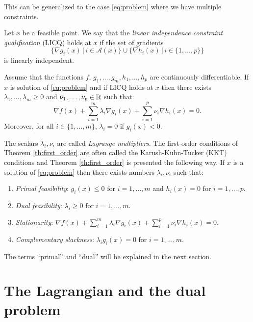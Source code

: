 \documentclass[11pt,nocut]{article}
\begin{document}
This can be generalized to the case \eqref{eq:problem} where we have multiple constraints.

\begin{definition}[LICQ]
	Let $x$ be a feasible point. We say that the \emph{linear independence constraint qualification} (LICQ) holds at $x$ if the set of gradients
	$$
	\big\{ \nabla g_i(x) \, \big| \, i \in \mathcal{A}(x) \big\}
	\cup
	\big\{ \nabla h_i(x) \, \big| \, i \in \{1, \dots, p\} \big\}
	$$
	is linearly independent.
\end{definition}

\begin{theorem}\label{th:first_order}
	Assume that the functions $f$, $g_1, \dots, g_m, h_1, \dots, h_p$ are continuously differentiable. If $x$ is solution of \eqref{eq:problem} and if LICQ holds at $x$
	then there exists $\lambda_1, \dots, \lambda_m \geq 0$ and $\nu_1, \dots, \nu_p \in \mathbb{R}$ such that:
	\begin{equation}\label{eq:kkt1}
		\nabla f(x) + \sum_{i=1}^m \lambda_i \nabla g_i(x) + \sum_{i=1}^p \nu_i \nabla h_i(x) = 0.
	\end{equation}
	Moreover, for all  $i\in \{1, \dots, m\}$, $\lambda_i = 0$ if $g_i(x) < 0$.
\end{theorem}

The scalars $\lambda_i, \nu_i$ are called \emph{Lagrange multipliers}.
The first-order conditions of Theorem \ref{th:first_order} are often called the Karush-Kuhn-Tucker (KKT) conditions and Theorem \ref{th:first_order} is presented the following way.
If $x$ is a solution of \eqref{eq:problem} then there exists numbers $\lambda_i,\nu_i$ such that:
\begin{enumerate}[label=(\roman*)]
	\item\label{item:kkt1} \emph{Primal feasibility}: $g_i(x) \leq 0$ for $i=1, \dots, m$ and $h_i(x) = 0$ for $i=1, \dots, p$.
	\item\label{item:kkt2} \emph{Dual feasibility}: $\lambda_i \geq 0$ for $i=1, \dots, m$.
	\item\label{item:kkt3} \emph{Stationarity}: $\nabla f(x) + \sum\limits_{i=1}^m \lambda_i \nabla g_i(x) + \sum\limits_{i=1}^p \nu_i \nabla h_i(x) = 0$.
	\item\label{item:kkt4} \emph{Complementary slackness}: $\lambda_i g_i(x) = 0$ for $i = 1 ,\dots, m$.
\end{enumerate}
The terms ``primal'' and ``dual'' will be explained in the next section.

\section{The Lagrangian and the dual problem}
\end{document}
